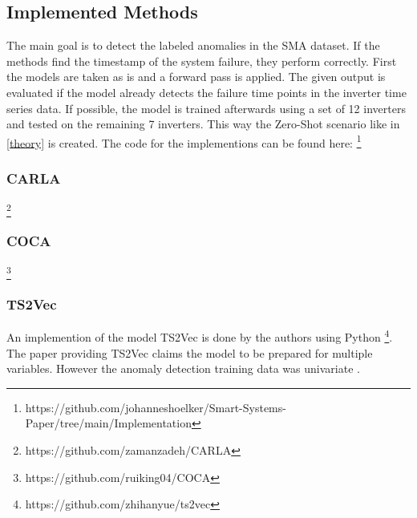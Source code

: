 
\subsection{Implemented Methods}
The main goal is to detect the labeled anomalies in the SMA dataset. If the methods find the timestamp of the system failure, they perform correctly. First the models are taken as is and a forward pass is applied. The given output is evaluated if the model already detects the failure time points in the inverter time series data. If possible, the model is trained afterwards using a set of 12 inverters and tested on the remaining 7 inverters. This way the Zero-Shot scenario like in \ref{theory} is created.
The code for the implementions can be found here: \footnote{\fussy\tiny https://github.com/johanneshoelker/Smart-Systems-Paper/tree/main/Implementation}


%

\subsubsection{CARLA}
\footnote{\fussy\tiny https://github.com/zamanzadeh/CARLA}


\subsubsection{COCA}
\footnote{\fussy\tiny https://github.com/ruiking04/COCA}

\subsubsection{TS2Vec}
An implemention of the model TS2Vec is done by the authors using Python \footnote{\fussy\tiny https://github.com/zhihanyue/ts2vec}.
The paper providing TS2Vec claims the model to be prepared for multiple variables. However the anomaly detection training data was univariate \cite{yue_ts2vec_2022}.

